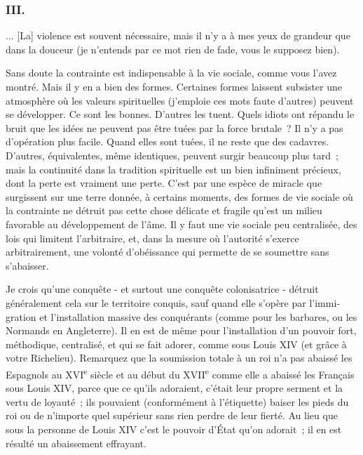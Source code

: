 \documentclass[french,twoside]{book} %
\begin{document}
\subsubsection[{III.}]{III.}
\noindent ... [La] violence est souvent nécessaire, mais il n'y a à mes yeux de grandeur que dans la douceur (je n'entends par ce mot rien de fade, vous le supposez bien).\par
Sans doute la contrainte est indispensable à la vie sociale, comme vous l'avez montré. Mais il y en a bien des formes. Certaines formes laissent subsister une atmosphère où les valeurs spirituelles (j'emploie ces mots faute d'autres) peuvent se développer. Ce sont les bonnes. D'autres les tuent. Quels idiots ont répandu le bruit que les idées ne peuvent pas être tuées par la force brutale ? Il n'y a pas d'opération plus facile. Quand elles sont tuées, il ne reste que des cadavres. D'autres, équivalentes, même identiques, peuvent surgir beaucoup plus tard ; mais la continuité dans la tradition spirituelle est un bien infiniment précieux, dont la perte est vraiment une perte. C'est par une espèce de miracle que surgissent sur une terre donnée, à certains moments, des for­mes de vie sociale où la contrainte ne détruit pas cette chose délicate et fragile qu'est un milieu favorable au développement de l'âme. Il y faut une vie sociale peu centralisée, des lois qui limitent l'arbitraire, et, dans la mesure où l'autorité s'exerce arbitrairement, une volonté d'obéissance qui permette de se soumettre sans s'abaisser.\par
Je crois qu'une conquête - et surtout une conquête colonisatrice - détruit généralement cela sur le territoire conquis, sauf quand elle s'opère par l'immi­gration et l'installation massive des conquérants (comme pour les barbares, ou les Normands en Angleterre). Il en est de même pour l'installation d'un pouvoir fort, méthodique, centralisé, et qui se fait adorer, comme sous Louis XIV (et grâce à votre Richelieu). Remarquez que la soumission totale à un roi n'a pas abaissé les Espagnols au XVI\textsuperscript{e} siècle et au début du XVII\textsuperscript{e} comme elle a abaissé les Français sous Louis XIV, parce que ce qu'ils adoraient, c'était leur propre serment et la vertu de loyauté ; ils pouvaient (conformément à l'étiquette) baiser les pieds du roi ou de n'importe quel supérieur sans rien perdre de leur fierté. Au lieu que sous la personne de Louis XIV c'est le pouvoir d'État qu'on adorait ; il en est résulté un abaissement effrayant.\par
\par
\end{document}
